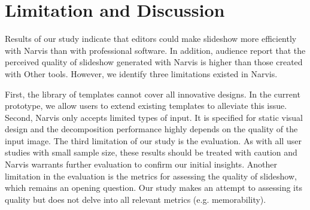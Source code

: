 \section{Limitation and Discussion}

Results of our study indicate that editors could make slideshow more efficiently with Narvis than with professional software. In addition, audience report that the perceived quality of slideshow generated with Narvis is higher than those created with Other tools. However, we identify three limitations existed in Narvis.

First, the library of templates cannot cover all innovative designs. In the current prototype, we allow users to extend existing templates to alleviate this issue. 
Second, Narvis only accepts limited types of input. It is specified for static visual design and  the decomposition performance highly depends on the quality of the input image. 
 The third limitation of our study is the evaluation. As with all user studies with small sample size, these results should be treated with caution and Narvis warrants further evaluation to confirm our initial insights. Another limitation in the evaluation is the metrics for assessing the quality of slideshow, which remains an opening question. Our study makes an attempt to assessing its quality but does not delve into all relevant metrics (e.g. memorability).





